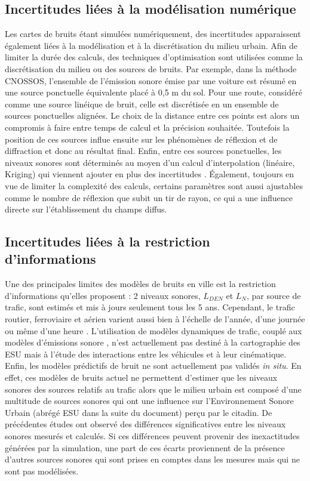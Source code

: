 \subsection{Incertitudes liées à la modélisation numérique}

Les cartes de bruits étant simulées numériquement, des incertitudes apparaissent également liées à la modélisation et à la discrétisation du milieu urbain. Afin de limiter la durée des calculs, des techniques d'optimisation sont utilisées comme la discrétisation du milieu ou des sources de bruits. Par exemple, dans la méthode CNOSSOS, l'ensemble de l'émission sonore émise par une voiture est résumé en une source ponctuelle équivalente placé à 0,5 m du sol. Pour une route, considéré comme une source linéique de bruit, celle est discrétisée en un ensemble de sources ponctuelles alignées. Le choix de la distance entre ces points est alors un compromis à faire entre temps de calcul et la précision souhaitée. Toutefois la position de ces sources influe ensuite sur les phénomènes de réflexion et de diffraction et donc au résultat final. Enfin, entre ces sources ponctuelles, les niveaux sonores sont déterminés au moyen d'un calcul d'interpolation (linéaire, Kriging) qui viennent ajouter en plus des incertitudes \cite{van_leeuwen_noise_2015}. 
Également, toujours en vue de limiter la complexité des calculs, certains paramètres sont aussi ajustables comme le nombre de réflexion que subit un tir de rayon, ce qui a une influence directe sur l'établissement du champs diffus. 

\subsection{Incertitudes liées à la restriction d'informations}

Une des principales limites des modèles de bruits en ville est la restriction d'informations qu'elles proposent : 2 niveaux sonores, $L_{DEN}$ et $L_N$, par source de trafic, sont estimés et mis à jours seulement tous les 5 ans. Cependant, le trafic routier, ferroviaire et aérien varient aussi bien à l'échelle de l'année, d'une journée ou même d'une heure \cite{lv2015traffic}. 
L'utilisation de modèles dynamiques de trafic, couplé aux modèles d'émissions sonore  \cite{can2010traffic}, n'est actuellement pas destiné à la cartographie des ESU mais à l'étude des interactions entre les véhicules et à leur cinématique. 
Enfin, les modèles prédictifs de bruit ne sont actuellement pas validés \textit{in situ}. En effet, ces modèles de bruits actuel ne permettent d'estimer que les niveaux sonores des sources relatifs au trafic alors que le milieu urbain est composé d'une multitude de sources sonores qui ont une influence sur l'Environnement Sonore Urbain (abrégé ESU dans la suite du document) perçu par le citadin. De précédentes études \cite{Mioduszewski, zannin_characterization_2013} ont observé des différences significatives entre les niveaux sonores mesurés et calculés. Si ces différences peuvent provenir des inexactitudes générées par la simulation, une part de ces écarts proviennent de la présence d'autres sources sonores qui sont prises en comptes dans les mesures mais qui ne sont pas modélisées.\\ 

